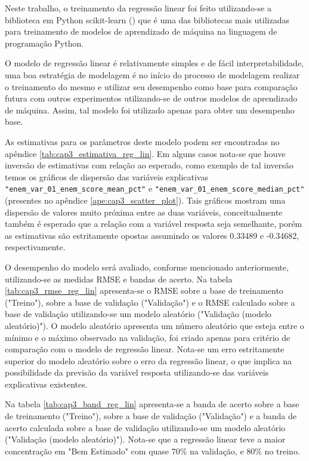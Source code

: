 Neste trabalho, o treinamento da regressão linear foi feito utilizando-se a biblioteca em Python scikit-learn (\citet{Sklearn}) que é uma das bibliotecas mais utilizadas para treinamento de modelos de aprendizado de máquina na linguagem de programação Python.

O modelo de regressão linear é relativamente simples e de fácil interpretabilidade, uma boa estratégia de modelagem é no início do processo de modelagem realizar o treinamento do mesmo e utilizar seu desempenho como base para comparação futura com outros experimentos utilizando-se de outros modelos de aprendizado de máquina. Assim, tal modelo foi utilizado apenas para obter um desempenho base.

As estimativas para os parâmetros deste modelo podem ser encontradas no apêndice \ref{tab:cap3_estimativa_reg_lin}. Em alguns casos nota-se que houve inversão de estimativas com relação ao esperado, como exemplo de tal inversão temos os gráficos de dispersão das variáveis explicativas \verb|"enem_var_01_enem_score_mean_pct"| e \verb|"enem_var_01_enem_score_median_pct"| (presentes no apêndice \ref{ape:cap3_scatter_plot}). Tais gráficos mostram uma dispersão de valores muito próxima entre as duas variáveis, conceitualmente também é esperado que a relação com a variável resposta seja semelhante, porém as estimativas são estritamente opostas assumindo os valores 0.33489 e -0.34682, respectivamente.

O desempenho do modelo será avaliado, conforme mencionado anteriormente, utilizando-se as medidas RMSE e bandas de acerto. Na tabela \ref{tab:cap3_rmse_reg_lin} apresenta-se o RMSE sobre a base de treinamento ("Treino"), sobre a base de validação ("Validação") e o RMSE calculado sobre a base de validação utilizando-se um modelo aleatório ("Validação (modelo aleatório)"). O modelo aleatório apresenta um número aleatório que esteja entre o mínimo e o máximo observado na validação, foi criado apenas para critério de comparação com o modelo de regressão linear. Nota-se um erro estritamente superior do modelo aleatório sobre o erro da regressão linear, o que implica na possibilidade da previsão da variável resposta utilizando-se das variáveis explicativas existentes.

Na tabela \ref{tab:cap3_band_reg_lin} apresenta-se a banda de acerto sobre a base de treinamento ("Treino"), sobre a base de validação ("Validação") e a banda de acerto calculada sobre a base de validação utilizando-se um modelo aleatório ("Validação (modelo aleatório)"). Nota-se que a regressão linear teve a maior concentração em "Bem Estimado" com quase 70\% na validação, e 80\% no treino.

